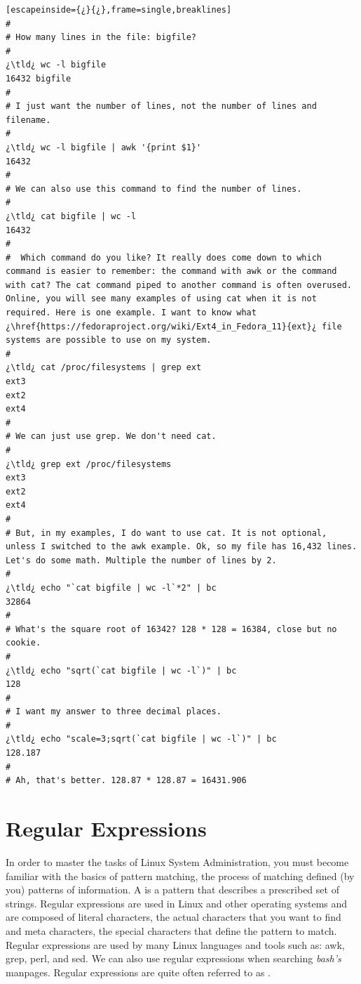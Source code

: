 \begin{lstlisting}[escapeinside={¿}{¿},frame=single,breaklines]
#
# How many lines in the file: bigfile? 
#
¿\tld¿ wc -l bigfile
16432 bigfile
#
# I just want the number of lines, not the number of lines and filename.
#
¿\tld¿ wc -l bigfile | awk '{print $1}'
16432
#
# We can also use this command to find the number of lines.
#
¿\tld¿ cat bigfile | wc -l
16432
#
#  Which command do you like? It really does come down to which command is easier to remember: the command with awk or the command with cat? The cat command piped to another command is often overused. Online, you will see many examples of using cat when it is not required. Here is one example. I want to know what ¿\href{https://fedoraproject.org/wiki/Ext4_in_Fedora_11}{ext}¿ file systems are possible to use on my system.
#
¿\tld¿ cat /proc/filesystems | grep ext
ext3
ext2
ext4
#
# We can just use grep. We don't need cat.
#
¿\tld¿ grep ext /proc/filesystems
ext3
ext2
ext4
#
# But, in my examples, I do want to use cat. It is not optional, unless I switched to the awk example. Ok, so my file has 16,432 lines. Let's do some math. Multiple the number of lines by 2.
#
¿\tld¿ echo "`cat bigfile | wc -l`*2" | bc
32864
#
# What's the square root of 16342? 128 * 128 = 16384, close but no cookie.
#
¿\tld¿ echo "sqrt(`cat bigfile | wc -l`)" | bc
128
#
# I want my answer to three decimal places.
#
¿\tld¿ echo "scale=3;sqrt(`cat bigfile | wc -l`)" | bc
128.187
#
# Ah, that's better. 128.87 * 128.87 = 16431.906
\end{lstlisting}

\section{Regular Expressions}

In order to master the tasks of Linux System Administration, you must become familiar with the basics of pattern matching, the process of matching defined (by you) patterns of information. A  is a pattern that describes a prescribed set of strings. Regular expressions are used in Linux and other operating systems and are composed of literal characters, the actual characters that you want to find and meta characters, the special characters that define the pattern to match. Regular expressions are used by many Linux languages and tools such as: awk, grep, perl, and sed. We can also use regular expressions when searching \emph{bash's} manpages. Regular expressions are quite often referred to as .

